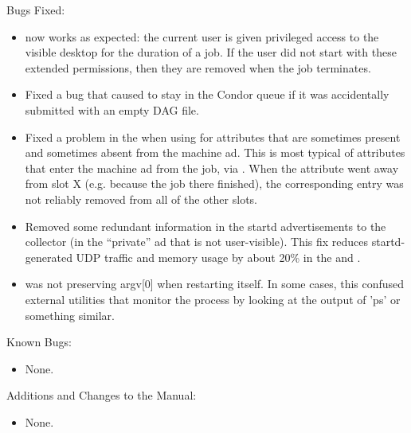 \noindent Bugs Fixed:

\begin{itemize}

\item {} now works as expected: the current user
is given privileged access to the visible desktop for the duration of a
job.  If the user did not start with these extended permissions, then they
are removed when the job terminates.

\item Fixed a bug that caused  to stay in the Condor
queue if it was accidentally submitted with an empty DAG file.

\item Fixed a problem in the  when using
 for attributes that are sometimes
present and sometimes absent from the machine ad.  This is most
typical of attributes that enter the machine ad from the job, via
.  When the attribute went away from slot
X (e.g. because the job there finished), the corresponding
 entry was not reliably removed from
all of the other slots.

\item Removed some redundant information in the startd advertisements
to the collector (in the ``private'' ad that is not user-visible).
This fix reduces startd-generated UDP traffic and memory usage by
about 20\% in the  and .

\item {} was not preserving argv[0] when restarting
itself.  In some cases, this confused external utilities that monitor
the  process by looking at the output of 'ps' or
something similar.

\end{itemize}

\noindent Known Bugs:

\begin{itemize}

\item None.

\end{itemize}

\noindent Additions and Changes to the Manual:

\begin{itemize}

\item None.

\end{itemize}

